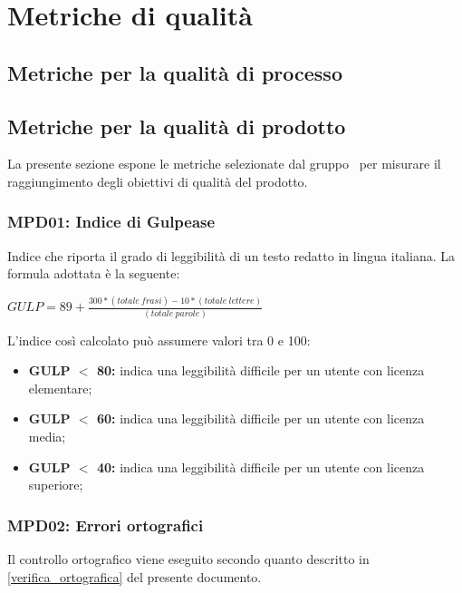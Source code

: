 \section{Metriche di qualità} \label{section:metriche_qualita}

\subsection{Metriche per la qualità di processo} \label{subsection:qualita_processo}


\subsection{Metriche per la qualità di prodotto} \label{subsection:qualita_prodotto}
La presente sezione espone le metriche selezionate dal gruppo \groupName\ per misurare il raggiungimento degli obiettivi di qualità del prodotto.
    
    \subsubsection{MPD01: Indice di Gulpease}
    Indice che riporta il grado di leggibilità di un testo redatto in lingua italiana.
    La formula adottata è la seguente: 
    \begin{center}
        $GULP = 89 + \displaystyle \frac{300*(totale\ frasi)-10*(totale\ lettere)}{(totale\ parole)}$
    \end{center}
    L’indice così calcolato può assumere valori tra 0 e 100:
    \begin{itemize}
        \item \textbf{GULP $<$ 80:} indica una leggibilità difficile per un utente con licenza elementare;
        \item \textbf{GULP $<$ 60:} indica una leggibilità difficile per un utente con licenza media;
        \item \textbf{GULP $<$ 40:} indica una leggibilità difficile per un utente con licenza superiore;
    \end{itemize}

    \subsubsection{MPD02: Errori ortografici}
    Il controllo ortografico viene eseguito secondo quanto descritto in \ref{verifica_ortografica} del presente documento.

